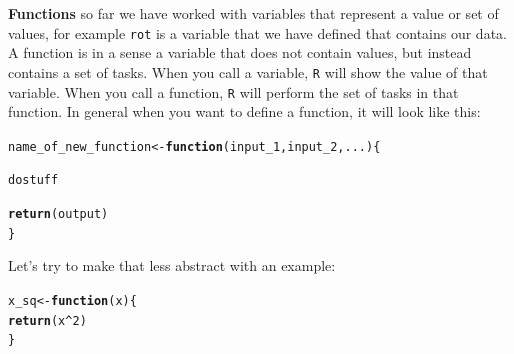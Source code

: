 \documentclass{article}\usepackage[]{graphicx}\usepackage[]{color}
\makeatletter
\newcommand{\hlnum}[1]{\textcolor[rgb]{0.686,0.059,0.569}{#1}}%
\newcommand{\hlopt}[1]{\textcolor[rgb]{0,0,0}{#1}}%
\newcommand{\hlstd}[1]{\textcolor[rgb]{0.345,0.345,0.345}{#1}}%
\newcommand{\hlkwa}[1]{\textcolor[rgb]{0.161,0.373,0.58}{\textbf{#1}}}%
\newcommand{\hlkwb}[1]{\textcolor[rgb]{0.69,0.353,0.396}{#1}}%
\newcommand{\hlkwc}[1]{\textcolor[rgb]{0.333,0.667,0.333}{#1}}%
\newcommand{\hlkwd}[1]{\textcolor[rgb]{0.737,0.353,0.396}{\textbf{#1}}}%
\newenvironment{kframe}{%
 \def\at@end@of@kframe{}%
 \ifinner\ifhmode%
  \def\at@end@of@kframe{\end{minipage}}%
  \begin{minipage}{\columnwidth}%
 \fi\fi%
 \def\FrameCommand##1{\hskip\@totalleftmargin \hskip-\fboxsep
 \colorbox{shadecolor}{##1}\hskip-\fboxsep
     \hskip-\linewidth \hskip-\@totalleftmargin \hskip\columnwidth}%
 \MakeFramed {\advance\hsize-\width
   \@totalleftmargin\z@ \linewidth\hsize
   \@setminipage}}%
 {\par\unskip\endMakeFramed%
 \at@end@of@kframe}
\newenvironment{knitrout}{}{} %
\makeatother
\begin{document}
\begin{mdframed}
\textbf{Functions} so far we have worked with variables that represent a value or set of values, for example \texttt{rot} is a variable that we have defined that contains our data. A function is in a sense a variable that does not contain values, but instead contains a set of tasks. When you call a variable, \texttt{R} will show the value of that variable. When you call a function, \texttt{R} will perform the set of tasks in that function. In general when you want to define a function, it will look like this:
\begin{knitrout}
\color{fgcolor}\begin{kframe}
\begin{alltt}
name_of_new_function <- \hlkwd{function}(input_1,input_2,...)\{

  do stuff
  
  \hlkwd{return}(output)
\}
\end{alltt}
\end{kframe}
\end{knitrout}
Let's try to make that less abstract with an example:
\begin{knitrout}
\color{fgcolor}\begin{kframe}
\begin{alltt}
\hlstd{x_sq} \hlkwb{<-} \hlkwa{function}\hlstd{(}\hlkwc{x}\hlstd{)\{}
  \hlkwd{return}\hlstd{(x}\hlopt{^}\hlnum{2}\hlstd{)}
\hlstd{\}}


\end{alltt}
\end{kframe}
\end{knitrout}
\end{mdframed}
\end{document}
